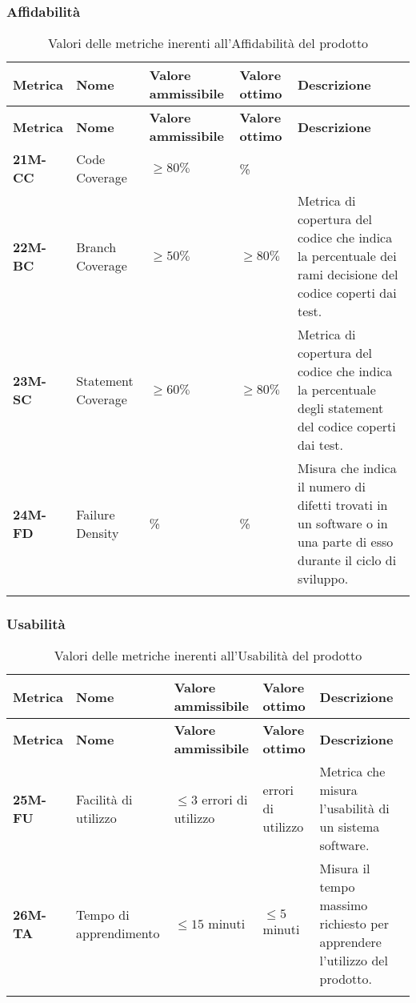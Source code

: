 \subsubsection{Affidabilità}
\begin{longtable}{|>{\centering\arraybackslash}p{}|>{\centering\arraybackslash}p{}|>{\centering\arraybackslash}p{}|>{\centering\arraybackslash}p{}|>{\centering\arraybackslash}p{}|}
    \hline
    \textbf{Metrica} & \textbf{Nome} & \textbf{Valore ammissibile} & \textbf{Valore ottimo}& \textbf{Descrizione}\\
	\hline
    \endfirsthead
    \hline
    \textbf{Metrica} & \textbf{Nome} & \textbf{Valore ammissibile} & \textbf{Valore ottimo}& \textbf{Descrizione}\\
    \endhead
	\hline
	\textbf{21M-CC} & Code Coverage & $\geq 80\% $  & 100\% &\\
	\hline
	\textbf{22M-BC} & Branch Coverage & $\geq 50\% $  & $\geq 80\% $ & Metrica di copertura del codice che indica la percentuale dei rami decisione del codice coperti dai test.\\ 
	\hline
	\textbf{23M-SC} & Statement Coverage & $\geq 60\% $ & $\geq 80\% $ & Metrica di copertura del codice che indica la percentuale degli statement del codice coperti dai test.\\ 
	\hline
	\textbf{24M-FD} & Failure Density & 100\%  & 100\%  & Misura che indica il numero di difetti trovati in un software o in una parte di esso durante il ciclo di sviluppo.\\ 
	\hline
	\caption{ Valori delle metriche inerenti all'Affidabilità del prodotto}
	\label{table:8}
\end{longtable}
\subsubsection{Usabilità}
\begin{longtable}{|>{\centering\arraybackslash}p{}|>{\centering\arraybackslash}p{}|>{\centering\arraybackslash}p{}|>{\centering\arraybackslash}p{}|>{\centering\arraybackslash}p{}|}
    \hline
    \textbf{Metrica} & \textbf{Nome} & \textbf{Valore ammissibile} & \textbf{Valore ottimo}& \textbf{Descrizione}\\
	\hline
    \endfirsthead
    \hline
    \textbf{Metrica} & \textbf{Nome} & \textbf{Valore ammissibile} & \textbf{Valore ottimo}& \textbf{Descrizione}\\
    \endhead
	\textbf{25M-FU} & Facilità di utilizzo & $\leq 3 $ errori di utilizzo & 0 errori di utilizzo & Metrica che misura l'usabilità di un sistema software.\\
	\hline
	\textbf{26M-TA} & Tempo di apprendimento & $\leq 15 $ minuti  & $\leq 5 $ minuti & Misura il tempo massimo richiesto per apprendere l'utilizzo del prodotto. \\ 
	\hline

	\caption{ Valori delle metriche inerenti all'Usabilità del prodotto}
	\label{table:9}
\end{longtable}
